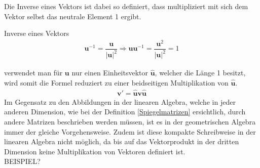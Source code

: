 Die Inverse eines Vektors ist dabei so definiert, dass multipliziert mit sich dem Vektor selbst das neutrale Element 1 ergibt.
\begin{definition}
	Inverse eines Vektors
	\begin{align}
		\mathbf{u}^{-1} = \dfrac{\mathbf{u}}{|\mathbf{u}|^2} \Rightarrow \mathbf{uu}^{-1} = \dfrac{\mathbf{u}^2}{|\mathbf{u}|^2} = 1
	\end{align}
\end{definition}

verwendet man für $\mathbf{u}$ nur einen Einheitsvektor $\mathbf{\hat{u}}$, welcher die Länge 1 besitzt, wird somit die Formel reduziert zu einer beidseitigen Multiplikation von $\mathbf{\hat{u}}$.
\begin{align}
	\mathbf{v'} = \mathbf{\hat{u}v\hat{u}}
\end{align}
Im Gegensatz zu den Abbildungen in der linearen Algebra, welche in jeder anderen Dimension, wie bei der Definition \eqref{Spiegelmatrizen} ersichtlich, durch andere Matrizen beschrieben werden müssen, ist es in der geometrischen Algebra immer der gleiche Vorgehensweise. Zudem ist diese kompakte Schreibweise in der linearen Algebra nicht möglich, da bis auf das Vektorprodukt in der dritten Dimension keine Multiplikation von Vektoren definiert ist. 
\\BEISPIEL?